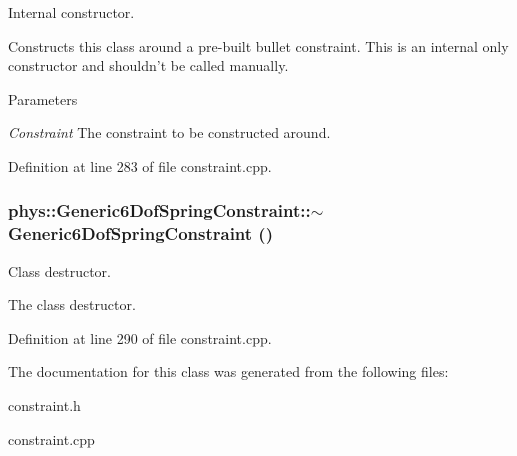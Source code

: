 Internal constructor. 

Constructs this class around a pre-\/built bullet constraint. This is an internal only constructor and shouldn't be called manually. 
\begin{DoxyParams}{Parameters}
\item[{\em Constraint}]The constraint to be constructed around. \end{DoxyParams}


Definition at line 283 of file constraint.cpp.

\hypertarget{classphys_1_1Generic6DofSpringConstraint_a245aa769d0b19ff01acf77e78e959cad}{
\subsubsection[{$\sim$Generic6DofSpringConstraint}]{\setlength{\rightskip}{0pt plus 5cm}phys::Generic6DofSpringConstraint::$\sim$Generic6DofSpringConstraint ()}}
\label{d1/dc7/classphys_1_1Generic6DofSpringConstraint_a245aa769d0b19ff01acf77e78e959cad}


Class destructor. 

The class destructor. 

Definition at line 290 of file constraint.cpp.



The documentation for this class was generated from the following files:\begin{DoxyCompactItemize}
\item 
constraint.h\item 
constraint.cpp\end{DoxyCompactItemize}
